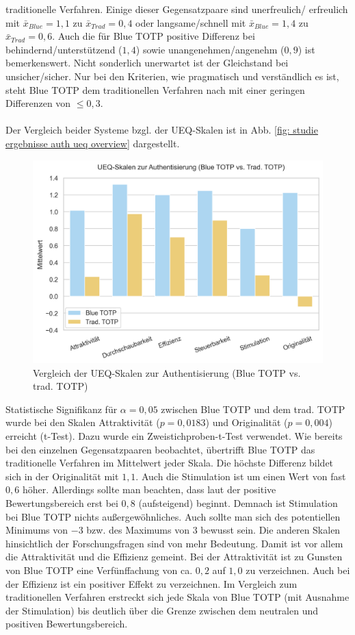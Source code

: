 traditionelle Verfahren. Einige dieser Gegensatzpaare sind \glqq unerfreulich/
erfreulich\grqq{} mit $\bar{x}_{Blue} = 1{,}1$ zu $\bar{x}_{Trad} = 0{,}4$ oder \glqq 
langsame/schnell\grqq{} mit $\bar{x}_{Blue} = 1{,}4$ zu $\bar{x}_{Trad} = 0{,}6$. 
Auch die für Blue TOTP positive Differenz bei \glqq behindernd/unterstützend\grqq{} 
($1{,}4$) sowie \glqq unangenehmen/angenehm\grqq{} ($0{,}9$) ist bemerkenswert. 
Nicht sonderlich unerwartet ist der Gleichstand bei \glqq unsicher/sicher\grqq{}. Nur 
bei den Kriterien, wie pragmatisch und verständlich es ist, steht Blue TOTP dem 
traditionellen Verfahren nach mit einer geringen Differenzen von $\le 0{,}3$.
\\\\
Der Vergleich beider Systeme bzgl. der UEQ-Skalen ist in Abb. \ref{fig: studie 
ergebnisse auth ueq overview} dargestellt.
\begin{figure}
    \centering
    \includegraphics[width=0.75\linewidth]{data_processing/questionaires/results/from_ueq_excel/ueq_overview_bt_trad.png}
    \caption[Vergleich der UEQ-Skalen zur Authentisierung (Blue TOTP vs. trad. TOTP)]{Vergleich der UEQ-Skalen zur Authentisierung (Blue TOTP vs. trad. TOTP)}
    \label{fig: studie ergebnisse auth ueq overview}
\end{figure}
Statistische Signifikanz für $\alpha = 0{,}05$ zwischen Blue TOTP und dem trad. TOTP wurde bei den Skalen Attraktivität ($p = 0{,}0183$) und Originalität ($p = 0{,}004$) erreicht (t-Test). Dazu wurde ein Zweistichproben-t-Test verwendet. Wie bereits bei den einzelnen Gegensatzpaaren beobachtet, übertrifft Blue TOTP das 
traditionelle Verfahren im Mittelwert jeder Skala. Die höchste Differenz bildet sich 
in der Originalität mit $1{,}1$. Auch die Stimulation ist um einen Wert von fast $0{,}
6$ höher. Allerdings sollte man beachten, dass laut \textcite{Schrepp} der positive 
Bewertungsbereich erst bei $0{,}8$ (aufsteigend) beginnt. Demnach ist Stimulation bei 
Blue TOTP nichts außergewöhnliches. Auch sollte man sich des potentiellen Minimums 
von $-3$ bzw. des Maximums von $3$ bewusst sein. Die anderen Skalen hinsichtlich der 
Forschungsfragen sind von mehr Bedeutung. Damit ist vor allem die 
Attraktivität und die Effizienz gemeint. Bei der Attraktivität ist zu Gunsten von 
Blue TOTP eine Verfünffachung von ca. $0{,}2$ auf $1{,}0$ zu verzeichnen. Auch bei 
der Effizienz ist ein positiver Effekt zu verzeichnen. Im Vergleich zum 
traditionellen Verfahren erstreckt sich jede Skala von Blue TOTP (mit Ausnahme der 
Stimulation) bis deutlich über die Grenze zwischen dem neutralen und positiven 
Bewertungsbereich.